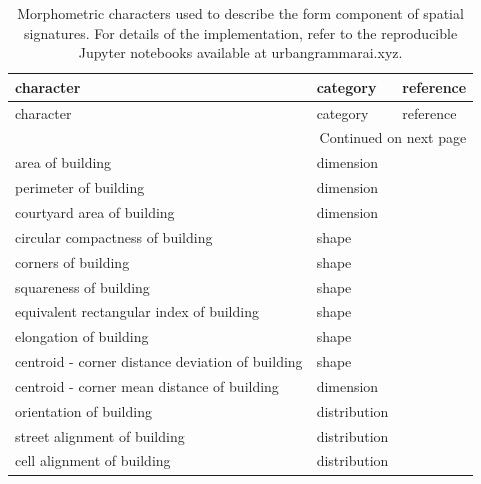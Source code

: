 \documentclass[fleqn,10pt]{wlscirep}
\begin{document}
\begin{longtable}{lll}
    \caption{\label{tab:form}Morphometric characters used to
    describe the form component of spatial signatures. For details of the implementation,
    refer to the reproducible Jupyter notebooks available at urbangrammarai.xyz.}\\
    \toprule
                                                character &     category &               reference \\
    \midrule
    \endfirsthead
    \toprule
                                                character &     category &               reference \\
    \midrule
    \endhead
    \midrule
    \multicolumn{3}{r}{{Continued on next page}} \\
    \midrule
    \endfoot
    \bottomrule
    \endlastfoot
                                        area of building &    dimension &    \cite{hallowell2013} \\
                                    perimeter of building &    dimension & \cite{vanderhaegen2017} \\
                            courtyard area of building &    dimension &     \cite{schirmer2015} \\
                        circular compactness of building &        shape & \cite{dibble2019origin} \\
                                    corners of building &        shape &    \cite{steiniger2008} \\
                                squareness of building &        shape &    \cite{steiniger2008} \\
                equivalent rectangular index of building &        shape &    \cite{basaraner2017} \\
                                elongation of building &        shape &    \cite{steiniger2008} \\
        centroid - corner distance deviation of building &        shape &  \cite{fleischmann2021} \\
            centroid - corner mean distance of building &    dimension &     \cite{schirmer2015} \\
                                orientation of building & distribution &     \cite{schirmer2015} \\
                            street alignment of building & distribution &     \cite{schirmer2015} \\
                            cell alignment of building & distribution &  \cite{fleischmann2021} \\

\end{longtable}
\end{document}
